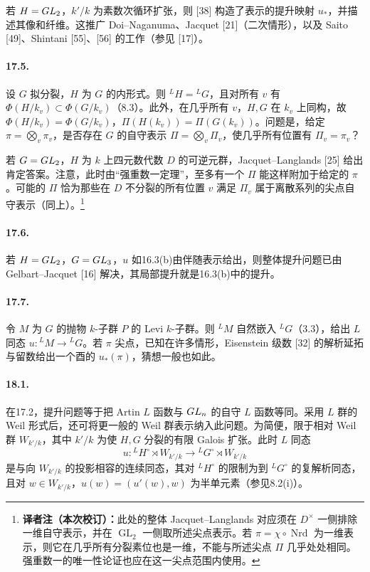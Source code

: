 若 $H=GL_2$，$k'/k$ 为素数次循环扩张，则 [38] 构造了表示的提升映射 $u_*$，并描述其像和纤维。这推广 Doi--Naganuma、Jacquet [21]（二次情形），以及 Saito [49]、Shintani [55]、[56] 的工作（参见 [17]）。

\paragraph*{17.5.} 设 $G$ 拟分裂，$H$ 为 $G$ 的内形式。则 ${}^LH={}^LG$，且对所有 $v$ 有 $\Phi(H/k_v)\subset\Phi(G/k_v)$（8.3）。此外，在几乎所有 $v$，$H,G$ 在 $k_v$ 上同构，故 $\Phi(H/k_v)=\Phi(G/k_v)$，$\Pi(H(k_v))=\Pi(G(k_v))$。问题是，给定 $\pi=\bigotimes_v\pi_v$，是否存在 $G$ 的自守表示 $\Pi=\bigotimes_v\Pi_v$，使几乎所有位置有 $\Pi_v=\pi_v$？

若 $G=GL_2$，$H$ 为 $k$ 上四元数代数 $D$ 的可逆元群，Jacquet--Langlands [25] 给出肯定答案。注意，此时由“强重数一定理”，至多有一个 $\Pi$ 能这样附加于给定的 $\pi$。可能的 $\Pi$ 恰为那些在 $D$ 不分裂的所有位置 $v$ 满足 $\Pi_v$ 属于离散系列的尖点自守表示（同上）。\footnote{\textbf{译者注（本次校订）：}此处的整体 Jacquet--Langlands 对应须在 $D^\times$ 一侧排除一维自守表示，并在 $\operatorname{GL}_2$ 一侧取所述尖点表示。若 $\pi=\chi\circ\operatorname{Nrd}$ 为一维表示，则它在几乎所有分裂素位也是一维，不能与所述尖点 $\Pi$ 几乎处处相同。强重数一的唯一性论证也应在这一尖点范围内使用。}

\paragraph*{17.6.} 若 $H=GL_2$，$G=GL_3$，$u$ 如16.3(b)由伴随表示给出，则整体提升问题已由 Gelbart--Jacquet [16] 解决，其局部提升就是16.3(b)中的提升。

\paragraph*{17.7.} 令 $M$ 为 $G$ 的抛物 $k$-子群 $P$ 的 Levi $k$-子群。则 ${}^LM$ 自然嵌入 ${}^LG$（3.3），给出 $L$ 同态 $u:{}^LM\to{}^LG$。若 $\pi$ 尖点，已知在许多情形，Eisenstein 级数 [32] 的解析延拓与留数给出一个酉的 $u_*(\pi)$，猜想一般也如此。

\paragraph*{18.1.} 在17.2，提升问题等于把 Artin $L$ 函数与 $GL_n$ 的自守 $L$ 函数等同。采用 $L$ 群的 Weil 形式后，还可将更一般的 Weil 群表示纳入此问题。为简便，限于相对 Weil 群 $W_{k'/k}$，其中 $k'/k$ 为使 $H,G$ 分裂的有限 Galois 扩张。此时 $L$ 同态
\[
 u:{}^LH^\circ\rtimes W_{k'/k}\longrightarrow{}^LG^\circ\rtimes W_{k'/k}
\]
是与向 $W_{k'/k}$ 的投影相容的连续同态，其对 ${}^LH^\circ$ 的限制为到 ${}^LG^\circ$ 的复解析同态，且对 $w\in W_{k'/k}$，$u(w)=(u'(w),w)$ 为半单元素（参见8.2(i)）。

